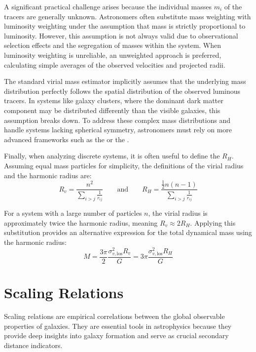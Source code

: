 A significant practical challenge arises because the individual masses $m_i$ of the tracers are generally unknown. Astronomers often substitute mass weighting with luminosity weighting under the assumption that mass is strictly proportional to luminosity. However, this assumption is not always valid due to observational selection effects and the segregation of masses within the system. When luminosity weighting is unreliable, an unweighted approach is preferred, calculating simple averages of the observed velocities and projected radii.

\begin{observationblock}
The standard virial mass estimator implicitly assumes that the underlying mass distribution perfectly follows the spatial distribution of the observed luminous tracers. In systems like galaxy clusters, where the dominant dark matter component may be distributed differently than the visible galaxies, this assumption breaks down. To address these complex mass distributions and handle systems lacking spherical symmetry, astronomers must rely on more advanced frameworks such as the  or the .
\end{observationblock}

Finally, when analyzing discrete systems, it is often useful to define the  $R_H$. Assuming equal mass particles for simplicity, the definitions of the virial radius and the harmonic radius are:
$$
R_v = \frac{n^2}{\sum_{i>j} \frac{1}{r_{ij}}} \qquad \text{and} \qquad R_H = \frac{\frac{1}{2}n(n-1)}{\sum_{i>j} \frac{1}{r_{ij}}}
$$

For a system with a large number of particles $n$, the virial radius is approximately twice the harmonic radius, meaning $R_v \approx 2 R_H$. Applying this substitution provides an alternative expression for the total dynamical mass using the harmonic radius:
$$
M = \frac{3\pi}{2} \frac{\sigma_{v,\mathrm{los}}^2 R_v}{G} = 3\pi \frac{\sigma_{v,\mathrm{los}}^2 R_H}{G}
$$

\section{Scaling Relations}

Scaling relations are empirical correlations between the global observable properties of galaxies. They are essential tools in astrophysics because they provide deep insights into galaxy formation and serve as crucial secondary distance indicators.

